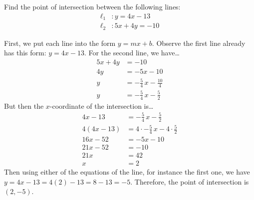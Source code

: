 \documentclass[11pt,letterpaper]{article}
\begin{document}
\newpage



 Find the point of intersection between the following lines: 
	\[
	\begin{aligned}
	\ell_1&: y= 4x - 13 \\[0.3cm]
	\ell_2&: 5x + 4y= -10 
	\end{aligned}
	\] \pspace

\sol First, we put each line into the form $y= mx + b$. Observe the first line already has this form: $y= 4x - 13$. For the second line, we have\dots
	\[
	\begin{aligned}
	5x + 4y&= -10 \\[0.3cm]
	4y&= -5x - 10 \\[0.3cm]
	y&= -\frac{5}{4}\,x - \frac{10}{4} \\[0.3cm]
	y&= -\frac{5}{4}\,x - \frac{5}{2} 
	\end{aligned}
	\]
But then the $x$-coordinate of the intersection is\dots
	\[
	\begin{aligned}
	4x - 13&= -\frac{5}{4}\,x - \frac{5}{2} \\[0.3cm]
	4(4x - 13)&= 4 \cdot -\frac{5}{4}\,x - 4 \cdot \frac{5}{2} \\[0.3cm]
	16x - 52&= -5x - 10 \\[0.3cm]
	21x - 52&= -10 \\[0.3cm]
	21x&= 42 \\[0.3cm]
	x&= 2
	\end{aligned}
	\]
Then using either of the equations of the line, for instance the first one, we have $y= 4x - 13= 4(2) - 13= 8 - 13= -5$. Therefore, the point of intersection is $(2, -5)$. 
\end{document}
